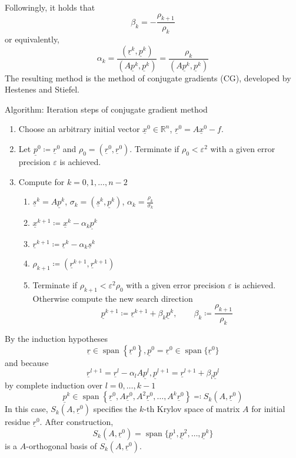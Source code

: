 \documentclass{article}
\begin{document}
Followingly, it holds that
\[ \beta_k = -\frac{\rho_{k+1}}{\rho_k} \]
or equivalently,
\[ \alpha_k = \frac{(\underline{r}^k, \underline{p}^k)}{(A \underline{p}^k, \underline{p}^k)} = \frac{\rho_k}{(A \underline{p}^k, \underline{p}^k)} \]
The resulting method is the method of conjugate gradients (CG), developed by Hestenes and Stiefel.

Algorithm: Iteration steps of conjugate gradient method %
\begin{enumerate}
  \item Choose an arbitrary initial vector $\underline{x}^0 \in \mathbb R^n$, $\underline{r}^0 = A \underline{x}^0 - f$.
  \item Let $\underline{p}^0 \coloneqq \underline{r}^0$ and $\rho_0 = (\underline{r}^0, \underline{r}^0)$. Terminate if $\rho_0 < \varepsilon^2$ with a given error precision $\varepsilon$ is achieved.
  \item Compute for $k=0,1,\ldots,n-2$
    \begin{enumerate}
      \item $\underline{s}^k = A \underline{p}^k$, $\sigma_k = (\underline{s}^k, \underline{p}^k)$, $\alpha_k = \frac{\rho_k}{\sigma_k}$
      \item $\underline{x}^{k+1} \coloneqq \underline{x}^k - \alpha_k \underline{p}^k$
      \item $\underline{r}^{k+1} \coloneqq \underline{r}^k - \alpha_k \underline{s}^k$
      \item $\rho_{k+1} \coloneqq (\underline{r}^{k+1}, \underline{r}^{k+1})$
      \item Terminate if $\rho_{k+1} < \varepsilon^2 \rho_0$ with a given error precision $\varepsilon$ is achieved. Otherwise compute the new search direction
    \[ \underline{p}^{k+1} \coloneqq \underline{r}^{k+1} + \beta_k \underline{p}^k, \qquad \beta_k \coloneqq \frac{\rho_{k+1}}{\rho_k} \]
    \end{enumerate}
\end{enumerate}

By the induction hypotheses
\[ \underline{r} \in \operatorname{span}\left\{\underline{r}^0\right\}, \underline{p}^0 = \underline{r}^0 \in \operatorname{span}\{\underline{r}^0\} \]
and because
\[ \underline{r}^{l+1} = \underline{r}^l - \alpha_l A \underline{p}^l, \underline{p}^{l+1} = \underline{r}^{l+1} + \beta_l \underline{p}^{l} \]
by complete induction over $l=0,\ldots,k-1$
\[ \underline{p}^k \in \operatorname{span}\left\{\underline r^0, A \underline r^0, A^2 \underline r^0, \ldots, A^k \underline r^0\right\} \eqqcolon S_k (A, \underline r^0) \]
In this case, $S_k(A, \underline r^0)$ specifies the $k$-th Krylov space of matrix $A$ for initial residue $\underline r^0$.
After construction,
\[ S_k(A, \underline r^0) = \operatorname{span}\{\underline p^1, \underline p^2, \ldots, \underline p^k\} \]
is a $A$-orthogonal basis of $S_k(A, \underline r^0)$.
\end{document}
